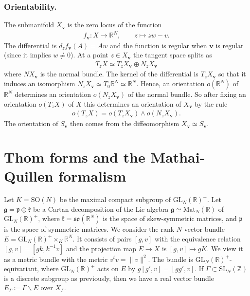 \documentclass[a4paper,11pt]{amsart} %
\newcommand{\8}{\infty}
\newcommand{\Z}{\mathbb{Z}}
\newcommand{\vbf}{\mathbf{v}}
\newcommand{\SO}{\mathrm{SO}}
\newcommand{\SL}{\mathrm{SL}}
\newcommand{\GL}{\mathrm{GL}}
\newcommand{\so}{\mathfrak{so}}
\newcommand{\R}{\mathbb{R}}
\newcommand{\p}{\mathfrak{p}}
\newcommand{\g}{\mathfrak{g}}
\newcommand{\kfrak}{\mathfrak{k}}
\newcommand{\Mat}{\mathrm{Mat}}
\theoremstyle{mytheoremstyle}
\theoremstyle{remark}
\numberwithin{equation}{section}
\begin{document}
\subsubsection{Orientability.} The submanifold $X_\vbf$ is the zero locus of the function
\begin{align}
    f_\vbf \colon X  \longrightarrow \R^N, \qquad
    z \longmapsto zw-v.
\end{align}
The differential is $d_zf_\vbf(A)=Aw$ and the function is regular when $\vbf$ is regular (since it implies $w \neq 0$). At a point $z \in X_\vbf$ the tangent space splits as
\begin{align}
    T_zX \simeq T_zX_\vbf \oplus N_zX_\vbf
\end{align}
where $NX_\vbf$ is the normal bundle. The kernel of the differential is $T_zX_\vbf$ so that it induces an isomorphism $N_zX_\vbf \simeq T_0\R^N \simeq \R^N$. Hence, an orientation $o(\R^N)$ of $\R^N$ determines an orientation $o(N_zX_\vbf)$ of the normal bundle. So after fixing an orientation $o(T_zX)$ of $X$ this determines an orientation of $X_\vbf$ by the rule
\begin{align}
    o(T_zX)=o(T_zX_\vbf)\wedge o(N_zX_\vbf).
\end{align}
The orientation of $S_\vbf$ then comes from the diffeomorphism $X_\vbf\simeq S_\vbf$. %

\section{Thom forms and the Mathai-Quillen formalism} \label{sec:mq}

Let $K=\SO(N)$ be the maximal compact subgroup of $\GL_N(\R)^+$. Let $\g=\p \oplus \kfrak$ be a Cartan decomposition of the Lie algebra $\g\simeq \Mat_N(\R)$ of $\GL_N(\R)^+$, where $\kfrak=\so(\R^{N})$ is the space of skew-symmetric matrices, and $\p$ is the space of symmetric matrices. We consider the rank $N$ vector bundle $E=\GL_N(\R)^+ \times_K \R^{N}$. It consists of pairs $[g,v]$ with the equivalence relation $[g,v]=[gk,k^{-1}v]$ and the projection map $E \rightarrow X$ is $[g,v] \mapsto gK$. We view it as a metric bundle with the metric $v^tv=\lVert v \rVert^2$. The bundle is $\GL_N(\R)^+$-equivariant, where $\GL_N(\R)^+$ acts on $E$ by $g[g',v]=[gg',v]$. If $\Gamma \subset \SL_N(\Z)$ is a discrete subgroup as previously, then we have a real vector bundle $E_\Gamma \coloneqq \Gamma \backslash E$ over $X_\Gamma$.
\end{document}
